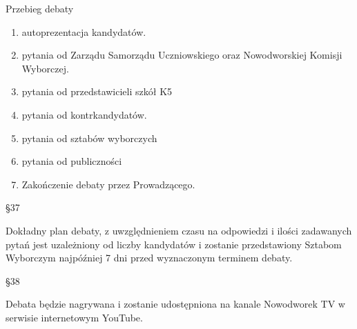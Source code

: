 \documentclass[12pt]{article}
\begin{document}
    Przebieg debaty
    \begin{enumerate}
        \item autoprezentacja kandydatów.
        \item pytania od Zarządu Samorządu Uczniowskiego oraz Nowodworskiej Komisji Wyborczej.
        \item pytania od przedstawicieli szkół K5
        \item pytania od kontrkandydatów.
        \item pytania od sztabów wyborczych
        \item pytania od publiczności
        \item Zakończenie debaty przez Prowadzącego.
    \end{enumerate}
    \begin{center}
        \S 37\\
    \end{center}
    Dokładny plan debaty, z uwzględnieniem czasu na odpowiedzi i ilości zadawanych pytań jest uzależniony od liczby kandydatów i zostanie przedstawiony Sztabom Wyborczym najpóźniej 7 dni przed wyznaczonym terminem debaty.\\
    \begin{center}
        \S 38\\
    \end{center}
    Debata będzie nagrywana i zostanie udostępniona na kanale Nowodworek TV w serwisie internetowym YouTube.
    
\end{document}
